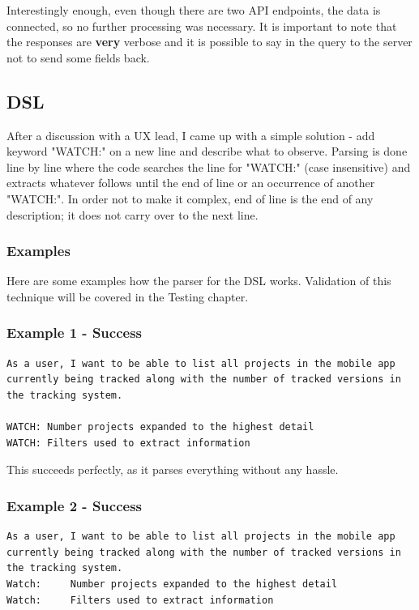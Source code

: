 Interestingly enough, even though there are two API endpoints, the data is connected, so no further processing was necessary. It is important to note that the responses are {\bf very} verbose and it is possible to say in the query to the server not to send some fields back.

\subsection{DSL}

After a discussion with a UX lead, I came up with a simple solution - add keyword "WATCH:" on a new line and describe what to observe. Parsing is done line by line where the code searches the line for "WATCH:" (case insensitive) and extracts whatever follows until the end of line or an occurrence of another "WATCH:". In order not to make it complex, end of line is the end of any description; it does not carry over to the next line.

\subsubsection{Examples}

Here are some examples how the parser for the DSL works. Validation of this technique will be covered in the Testing chapter.

\subsubsection*{Example 1 - Success}

\begin{lstlisting}
As a user, I want to be able to list all projects in the mobile app currently being tracked along with the number of tracked versions in the tracking system.

WATCH: Number projects expanded to the highest detail
WATCH: Filters used to extract information
\end{lstlisting}

This succeeds perfectly, as it parses everything without any hassle.

\subsubsection*{Example 2 - Success}

\begin{lstlisting}
As a user, I want to be able to list all projects in the mobile app currently being tracked along with the number of tracked versions in the tracking system. 
Watch:     Number projects expanded to the highest detail
Watch:     Filters used to extract information
\end{lstlisting}

